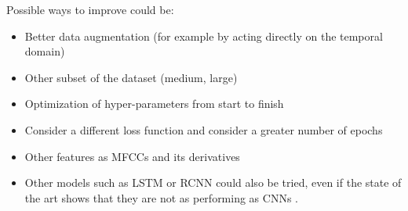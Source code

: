 \vspace{4mm}
\noindent
Possible ways to improve could be:
\begin{itemize}
  \item Better data augmentation (for example by acting directly on the temporal domain)
  \item Other subset of the dataset (medium, large)
  \item Optimization of hyper-parameters from start to finish
  \item Consider a different loss function and consider a greater number of epochs
  \item Other features as MFCCs and its derivatives
  \item Other models such as LSTM or RCNN could also be tried, even if the state of the art shows that they are not as performing as CNNs \cite{kostrzewa2021music}.
\end{itemize}
